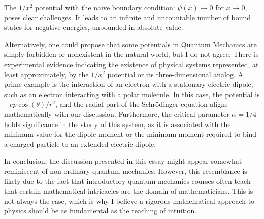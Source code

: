 The $1/x^2$ potential with the naive boundary condition: $\psi(x) \to 0$ for $x \to 0$, poses clear challenges. It leads to an infinite and uncountable number of bound states for negative energies, unbounded in absolute value.

\vspace{4mm}
\noindent
Alternatively, one could propose that some potentials in Quantum Mechanics are simply forbidden or nonexistent in the natural world, but I do not agree. There is experimental evidence indicating the existence of physical systems represented, at least approximately, by the $1/x^2$ potential or its three-dimensional analog. A prime example is the interaction of an electron with a stationary electric dipole, such as an electron interacting with a polar molecule. In this case, the potential is $-e p \cos(\theta)/r^2$, and the radial part of the Schrödinger equation aligns mathematically with our discussion. Furthermore, the critical parameter $\alpha = 1/4$ holds significance in the study of this system, as it is associated with the minimum value for the dipole moment or the minimum moment required to bind a charged particle to an extended electric dipole.

\vspace{4mm}
\noindent
In conclusion, the discussion presented in this essay might appear somewhat reminiscent of non-ordinary quantum mechanics. However, this resemblance is likely due to the fact that introductory quantum mechanics courses often teach that certain mathematical intricacies are the domain of mathematicians. This is not always the case, which is why I believe a rigorous mathematical approach to physics should be as fundamental as the teaching of intuition.